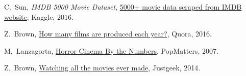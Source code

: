 \documentclass{article}
\begin{document}
\blindtext

\clearpage

\begin{thebibliography}{1}


C.~Sun, \emph{IMDB 5000 Movie Dataset}, \href{https://www.kaggle.com/deepmatrix/imdb-5000-movie-dataset}{5000+ movie data scraped from IMDB website}, \relax Kaggle, 2016.

Z.~Brown, \href{https://www.quora.com/How-many-films-are-produced-each-year}{How many films are produced each year?}, \relax Quora, 2016.

M.~Lanzagorta, \href{http://www.popmatters.com/column/horror-cinema-by-the-numbers/}{Horror Cinema By the Numbers}, \relax PopMatters, 2007.

Z.~Brown, \href{http://www.justgeek.de/watching-all-the-movies-ever-made/}{Watching all the movies ever made}, \relax Justgeek, 2014.

\end{thebibliography}

%




\end{document}
